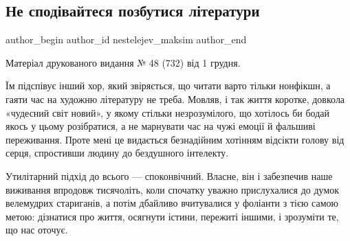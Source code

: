  
 
 
 
 
\subsection{Не сподівайтеся позбутися літератури}
\label{sec:08_12_2021.stz.news.ua.tyzhden.1.literatura}

\ifcmt
 author_begin
   author_id nestelejev_maksim
 author_end
\fi

Матеріал друкованого видання № 48 (732) від 1 грудня.


Їм підспівує інший хор, який звіряється, що читати варто тільки нонфікшн, а
гаяти час на художню літературу не треба. Мовляв, і так життя коротке, довкола
«чудесний світ новий», у якому стільки незрозумілого, що хотілось би бодай
якось у цьому розібратися, а не марнувати час на чужі емоції й фальшиві
переживання. Проте мені це видається безнадійним хотінням відсікти голову від
серця, спростивши людину до бездушного інтелекту.

Утилітарний підхід до всього — споконвічний. Власне, він і забезпечив наше
виживання впродовж тисячоліть, коли спочатку уважно прислухалися до думок
велемудрих стариганів, а потім дбайливо вчитувалися у фоліанти з тією самою
метою: дізнатися про життя, осягнути істини, пережиті іншими, і зрозуміти те,
що нас оточує.

\zzrule

